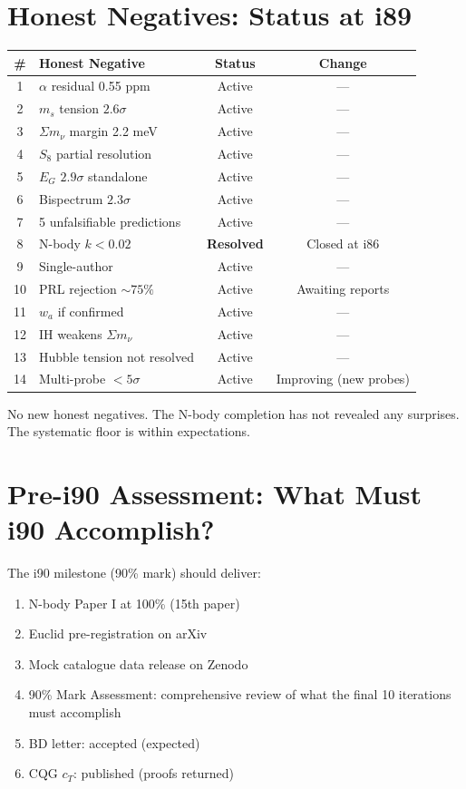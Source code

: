 \documentclass[11pt,a4paper]{article}
\begin{document}
\section{Honest Negatives: Status at i89}

\begin{center}
\begin{tabular}{clcc}
\toprule
\textbf{\#} & \textbf{Honest Negative} & \textbf{Status} & \textbf{Change} \\
\midrule
1 & $\alpha$ residual 0.55 ppm & Active & --- \\
2 & $m_s$ tension $2.6\sigma$ & Active & --- \\
3 & $\Sigma m_\nu$ margin 2.2 meV & Active & --- \\
4 & $S_8$ partial resolution & Active & --- \\
5 & $E_G$ $2.9\sigma$ standalone & Active & --- \\
6 & Bispectrum $2.3\sigma$ & Active & --- \\
7 & 5 unfalsifiable predictions & Active & --- \\
8 & N-body $k < 0.02$ & \textbf{Resolved} & Closed at i86 \\
9 & Single-author & Active & --- \\
10 & PRL rejection $\sim 75\%$ & Active & Awaiting reports \\
11 & $w_a$ if confirmed & Active & --- \\
12 & IH weakens $\Sigma m_\nu$ & Active & --- \\
13 & Hubble tension not resolved & Active & --- \\
14 & Multi-probe $< 5\sigma$ & Active & Improving (new probes) \\
\bottomrule
\end{tabular}
\end{center}

No new honest negatives. The N-body completion has not revealed any surprises. The systematic floor is within expectations.

\section{Pre-i90 Assessment: What Must i90 Accomplish?}

The i90 milestone (90\% mark) should deliver:

\begin{enumerate}[nosep]
\item N-body Paper I at 100\% (15th paper)
\item Euclid pre-registration on arXiv
\item Mock catalogue data release on Zenodo
\item 90\% Mark Assessment: comprehensive review of what the final 10 iterations must accomplish
\item BD letter: accepted (expected)
\item CQG $c_T$: published (proofs returned)
\end{enumerate}
\end{document}
